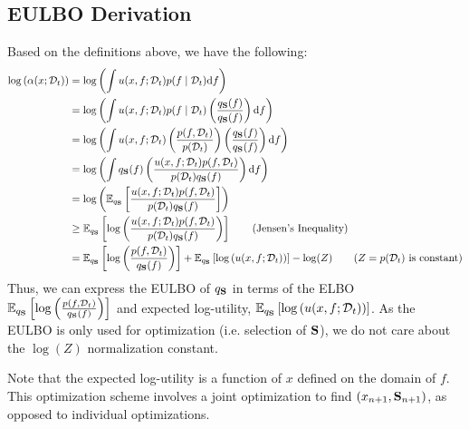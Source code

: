 \documentclass[11pt]{article}
\numberwithin{figure}{section}
\numberwithin{equation}{section}
\begin{document}
\subsection{EULBO Derivation}
Based on the definitions above, we have the following: 
\begin{align*}
    \log\left(\alpha(x; \calD_{t})\right) &= \log\left(\int u(x, f; \calD_{t})p(f \mid \calD_{t})\textrm{d}f\right)\\
    &= \log\left(\int u(x, f; \calD_{t})p(f \mid \calD_{t})\left(\frac{q_{\bfS}(f)}{q_{\bfS}(f)}\right)\textrm{d}f\right)\\
    &= \log\left(\int u(x, f; \calD_{t})\left(\frac{p(f, \calD_{t})}{p(\calD_{t})}\right)\left(\frac{q_{\bfS}(f)}{q_{\bfS}(f)}\right)\textrm{d}f\right)\\
    &= \log\left(\int q_{\bfS}(f)\left(\frac{u(x, f; \calD_{t})p(f, \calD_{t})}{p(\calD_{t})q_{\bfS}(f)}\right)\textrm{d}f\right)\\
    &= \log\left(\expec[q_{\bfS}]{\frac{u(x, f; \calD_{t})p(f, \calD_{t})}{p(\calD_{t})q_{\bfS}(f)}}\right)\\
    &\ge \expec[q_{\bfS}]{\log\left(\frac{u(x, f; \calD_{t})p(f, \calD_{t})}{p(\calD_{t})q_{\bfS}(f)}\right)}\tag{Jensen's Inequality}\\
    &= \expec[q_{\bfS}]{\log\left(\frac{p(f, \calD_{t})}{q_{\bfS}(f)}\right)} + \expec[q_{\bfS}]{\log\left({u(x, f; \calD_{t})}\right)} - \log(Z) \tag{$Z = p(\calD_{t})$ is constant}
\end{align*}
Thus, we can express the EULBO of $q_{\bfS}$ in terms of the ELBO $\expec[q_{\bfS}]{\log\left(\frac{p(f, \calD_{t})}{q_{\bfS}(f)}\right)}$ and expected log-utility, $\expec[q_{\bfS}]{\log\left({u(x, f; \calD_{t})}\right)}$. As the EULBO is only used for optimization (i.e. selection of $\bfS$), we do not care about the $\log(Z)$ normalization constant.  

Note that the expected log-utility is a function of $x$ defined on the domain of $f$. This optimization scheme involves a joint optimization to find $(x_{n+1}, \bfS_{n+1})$, as opposed to individual optimizations. 
\end{document}
